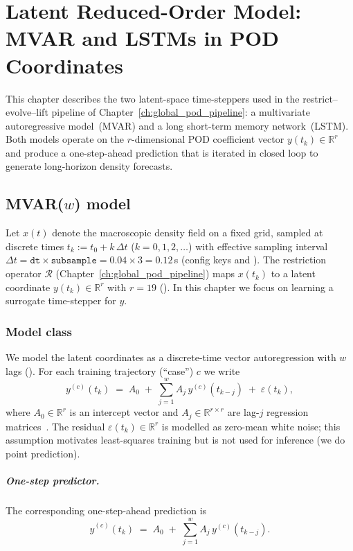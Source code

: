 \documentclass{report}
\theoremstyle{plain}
\theoremstyle{remark}
\numberwithin{equation}{section}              %
\begin{document}
%
\chapter{Latent Reduced-Order Model: MVAR and LSTMs in POD Coordinates}
\label{ch:latent_rom}

This chapter describes the two latent-space time-steppers used in the
restrict--evolve--lift pipeline of Chapter~\ref{ch:global_pod_pipeline}:
a multivariate autoregressive model~(MVAR) and a long short-term memory
network~(LSTM).
Both models operate on the $r$-dimensional POD coefficient vector
$y(t_k)\in\mathbb{R}^r$ and produce a one-step-ahead prediction that is
iterated in closed loop to generate long-horizon density forecasts.

%
\section{MVAR(\texorpdfstring{$w$}{w}) model}
\label{sec:mvar_definition}
%

Let $x(t)$ denote the macroscopic density field on a fixed grid, sampled at
discrete times $t_k := t_0 + k\,\Delta t$ ($k = 0,1,2,\dots$) with effective sampling interval
$\Delta t = \texttt{dt}\times\texttt{subsample} = 0.04\times 3 = 0.12$\,s
(config keys  and ).
The restriction operator $\mathcal{R}$ (Chapter~\ref{ch:global_pod_pipeline}) maps
$x(t_k)$ to a latent coordinate $y(t_k)\in\mathbb{R}^r$ with
$r=19$ ().
In this chapter we focus on learning a surrogate time-stepper for $y$.

\subsection{Model class}
We model the latent coordinates as a discrete-time vector autoregression with
$w$ lags ().
For each training trajectory (``case'') $c$ we write
\begin{equation}\label{eq:mvar_def}
  y^{(c)}(t_k) \;=\; A_0 \;+\; \sum_{j=1}^{w} A_j\,y^{(c)}(t_{k-j})
                 \;+\; \varepsilon(t_k),
\end{equation}
where $A_0\in\mathbb{R}^r$ is an intercept vector and
$A_j\in\mathbb{R}^{r\times r}$ are lag-$j$ regression matrices~\cite{alvarez2025eqfree}.
The residual $\varepsilon(t_k)\in\mathbb{R}^r$ is modelled as zero-mean
white noise; this assumption motivates least-squares training but is not
used for inference (we do point prediction).

\paragraph{One-step predictor.}
The corresponding one-step-ahead prediction is
\begin{equation}\label{eq:mvar_predictor}
  \hat y^{(c)}(t_k) \;=\; A_0 \;+\;
  \sum_{j=1}^{w} A_j\,y^{(c)}(t_{k-j}).
\end{equation}
\end{document}
